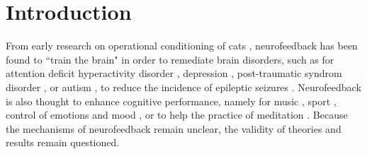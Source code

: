 \section{Introduction}





From early research on operational conditioning of cats \cite{wyrwicka1968instrumental,sterman1969electrophysiological}, neurofeedback has been found to ``train the brain" in order to remediate brain disorders, such as for attention deficit hyperactivity disorder \cite{lubar1976eeg,monastra2006electroencephalographic},  depression \cite{saxby1995alpha},  post-traumatic syndrom disorder \cite{peniston1991alpha}, or autism \cite{kouijzer2009neurofeedback,coben2010neurofeedback}, to reduce the incidence of epileptic seizures \cite{sterman2006foundation}. Neurofeedback is also thought to enhance cognitive performance, namely for music \cite{egner2003ecological}, sport \cite{wilson2006mind}, control of emotions \cite{gruzelier2014eeg} and mood \cite{raymond2005effects}, or to help the practice of meditation \cite{gruzelier2009theory,rubik2011neurofeedback,brandmeyer2013meditation}. Because the mechanisms of neurofeedback remain unclear, the validity of theories and results remain questioned\cite{beyerstein1990brainscams,vernon2009alpha}.\\

